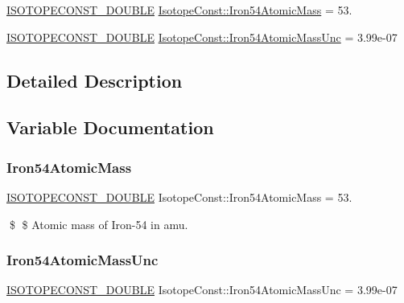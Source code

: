 \begin{DoxyCompactItemize}
\item 
\mbox{\hyperlink{group___isotope_const-_macros_ga8f45a7272ce02c0b4c65c44636ed719a}{I\+S\+O\+T\+O\+P\+E\+C\+O\+N\+S\+T\+\_\+\+D\+O\+U\+B\+LE}} \mbox{\hyperlink{group___isotope_const-_iron-_fe54_ga80a10cb4d838c8611070e52d5b8d562b}{Isotope\+Const\+::\+Iron54\+Atomic\+Mass}} = 53.
\item 
\mbox{\hyperlink{group___isotope_const-_macros_ga8f45a7272ce02c0b4c65c44636ed719a}{I\+S\+O\+T\+O\+P\+E\+C\+O\+N\+S\+T\+\_\+\+D\+O\+U\+B\+LE}} \mbox{\hyperlink{group___isotope_const-_iron-_fe54_gabe603e05d7cfee1c62de8f0b1ef73b4d}{Isotope\+Const\+::\+Iron54\+Atomic\+Mass\+Unc}} = 3.\+99e-\/07
\end{DoxyCompactItemize}


\subsection{Detailed Description}


\subsection{Variable Documentation}
\mbox{\label{group___isotope_const-_iron-_fe54_ga80a10cb4d838c8611070e52d5b8d562b}} 
\subsubsection{\texorpdfstring{Iron54\+Atomic\+Mass}{Iron54AtomicMass}}
{\footnotesize\ttfamily \mbox{\hyperlink{group___isotope_const-_macros_ga8f45a7272ce02c0b4c65c44636ed719a}{I\+S\+O\+T\+O\+P\+E\+C\+O\+N\+S\+T\+\_\+\+D\+O\+U\+B\+LE}} Isotope\+Const\+::\+Iron54\+Atomic\+Mass = 53.}

\$ \$ Atomic mass of Iron-\/54 in amu. \mbox{\label{group___isotope_const-_iron-_fe54_gabe603e05d7cfee1c62de8f0b1ef73b4d}} 
\subsubsection{\texorpdfstring{Iron54\+Atomic\+Mass\+Unc}{Iron54AtomicMassUnc}}
{\footnotesize\ttfamily \mbox{\hyperlink{group___isotope_const-_macros_ga8f45a7272ce02c0b4c65c44636ed719a}{I\+S\+O\+T\+O\+P\+E\+C\+O\+N\+S\+T\+\_\+\+D\+O\+U\+B\+LE}} Isotope\+Const\+::\+Iron54\+Atomic\+Mass\+Unc = 3.\+99e-\/07}

